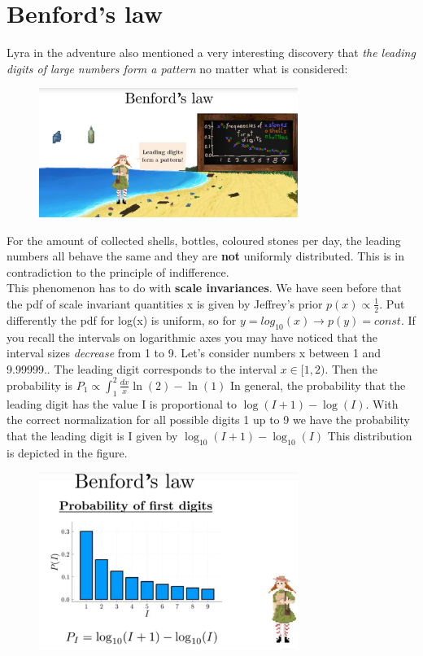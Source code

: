 \documentclass[12pt, a4paper]{scrartcl}
\begin{document}
\section*{Benford's law}
Lyra in the adventure also mentioned a very interesting discovery that \textit{the
leading digits of large numbers form a pattern} no matter what is considered: %
 \begin{figure}[H]
	\centering
	\includegraphics[width=0.75\textwidth]{8_14.png}
\end{figure}
For the amount of collected shells, bottles, coloured stones per day, the leading numbers all behave the same and
they are  \textbf{not} uniformly distributed. This is in contradiction to the principle
of indiﬀerence.\\
This phenomenon has to do with  \textbf{scale invariances}. We have seen before that
the pdf of scale invariant quantities x is given by Jeﬀrey’s prior $p(x)\propto \frac 12$.
Put diﬀerently the pdf for log(x) is uniform, so for $y=log_{10}(x)\rightarrow p(y)=const$.
If you recall the intervals on logarithmic axes you may have noticed that the
interval sizes \textit{decrease} from 1 to 9.%
Let’s consider numbers x between 1 and 9.99999..
The leading digit corresponds to the interval $x \in [1,2)$.
Then the probability is $P_1\propto \int_1^2\frac{dx}{x}\ln(2)-\ln(1)$
In general, the probability that the leading digit has the value I is proportional to $\log(I+1)-\log(I)$.
With the correct normalization for all possible digits 1 up to 9 we have the probability that the leading digit is I given by $\log_{10}(I+1)-\log_{10}(I)$
This distribution is depicted in the ﬁgure.\\%
 \begin{figure}[H]
	\centering
	\includegraphics[width=0.75\textwidth]{8_15.png}
\end{figure}
\end{document}
